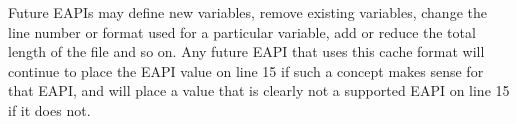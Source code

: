 Future EAPIs may define new variables, remove existing variables, change the line number or
format used for a particular variable, add or reduce the total length of the file and so on.
Any future EAPI that uses this cache format will continue to place the EAPI value on
line 15 if such a concept makes sense for that EAPI, and will place a value that is clearly
not a supported EAPI on line 15 if it does not.



